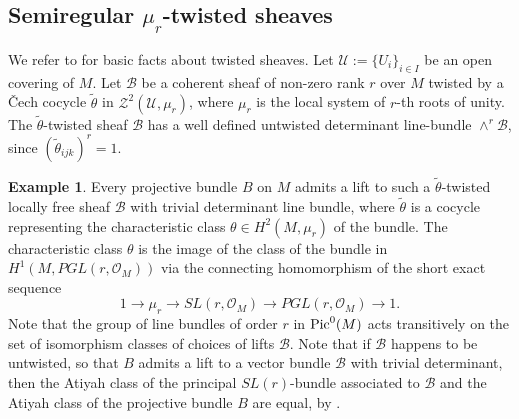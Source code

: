 \documentclass[12pt]{amsart}
\numberwithin{equation}{subsection}
\theoremstyle{plain}
\theoremstyle{definition}
\newtheorem{example}[thm]{Example}
\newcommand{\B}{{\mathcal B}}
\newcommand{\U}{{\mathcal U}}
\newcommand{\Z}{{\mathcal Z}}
\newcommand{\StructureSheaf}[1]{{\mathcal O}_{#1}}
\newcommand{\Pic}{{\rm Pic}}
\begin{document}
% 
\subsection{Semiregular $\mu_r$-twisted sheaves}
\label{sec-semiregular-twisted-sheaves}
We refer to \cite{caldararu-thesis} for basic facts about twisted sheaves.
Let $\U:=\{U_i\}_{i\in I}$ be an open covering of $M$.
Let $\B$ be a coherent sheaf of non-zero rank $r$ over $M$ twisted by a \v{C}ech cocycle $\tilde{\theta}$ in $\Z^2(\U,\mu_r)$,
where $\mu_r$ is the local system of $r$-th roots of unity.
The $\tilde{\theta}$-twisted sheaf $\B$ has a well defined untwisted determinant line-bundle $\wedge^r\B$, since $(\tilde{\theta}_{ijk})^r=1$.


\begin{example}
\label{example-a-lift-of-a-projective-bundle-to-a-mu-r-twisted-sheaf}
Every projective bundle $B$ on $M$ admits a lift to such a $\tilde{\theta}$-twisted locally free sheaf $\B$ with trivial determinant line bundle, where $\tilde{\theta}$ is a cocycle representing  
the  characteristic class $\theta\in H^2(M,\mu_r)$ of the bundle. The characteristic class  $\theta$ is the image of the class of the bundle in $H^1(M,PGL(r,\StructureSheaf{M}))$ via the connecting homomorphism of the short exact sequence
\begin{equation}
\label{eq-short-exact-sequence-mu-r-SL-PGL}
1\rightarrow \mu_r \rightarrow SL(r,\StructureSheaf{M})\rightarrow PGL(r,\StructureSheaf{M})\rightarrow 1.
\end{equation}
Note that the group of line bundles of order $r$ in $\Pic^0(M)$ acts transitively on the set of isomorphism classes of choices of lifts $\B$. 
Note that if $\B$ happens to be untwisted, so that $B$ admits a lift to a vector bundle $\B$ with trivial determinant, then the Atiyah class of the principal $SL(r)$-bundle associated to $\B$ and the Atiyah class of the projective bundle $B$ are equal, by
\cite[page 189 property (1)]{atiyah}.
\end{example}
\end{document}
